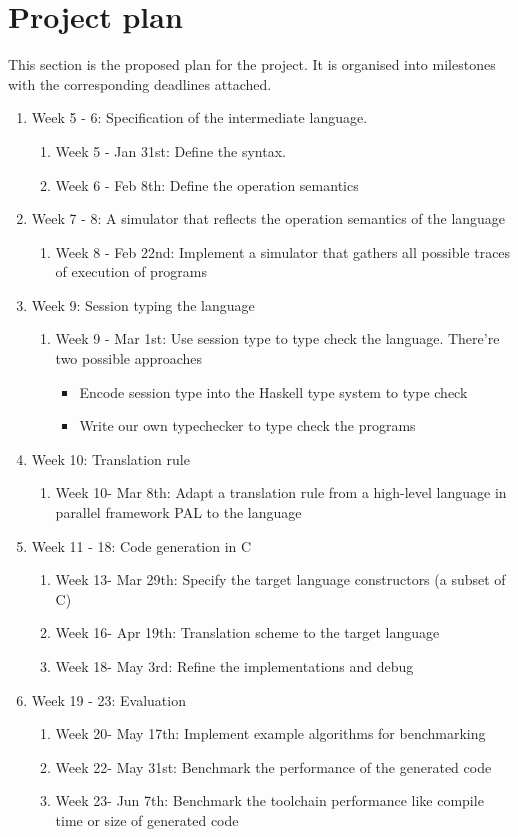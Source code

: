 \chapter{Project plan} \label{plan}
This section is the proposed plan for the project. It is organised into milestones with the corresponding deadlines attached.
\begin{enumerate}
\item Week 5 - 6: Specification of the intermediate language.
\begin{enumerate}
    \item Week 5 - Jan 31st: Define the syntax.  
    \item Week 6 - Feb 8th: Define the operation semantics
\end{enumerate}
\item Week 7 - 8: A simulator that reflects the operation semantics of the language
\begin{enumerate}
    \item Week 8 - Feb 22nd: Implement a simulator that gathers all possible traces of execution of programs
\end{enumerate}
\item Week 9: Session typing the language
\begin{enumerate}
    \item Week 9 - Mar 1st: Use session type to type check the language. There're two possible approaches
    \begin{itemize}
        \item Encode session type into the Haskell type system to type check 
        \item Write our own typechecker to type check the programs
    \end{itemize} 
\end{enumerate}
\item Week 10: Translation rule 
\begin{enumerate}
    \item Week 10- Mar 8th: Adapt a translation rule from a high-level language in parallel framework PAL to the language
\end{enumerate}
\item Week 11 - 18: Code generation in C
\begin{enumerate}
    \item Week 13- Mar 29th: Specify the target language constructors (a subset of C)
    \item Week 16- Apr 19th: Translation scheme to the target language
    \item Week 18- May 3rd: Refine the implementations and debug
\end{enumerate}
\item Week 19 - 23: Evaluation
\begin{enumerate}
    \item Week 20- May 17th: Implement example algorithms for benchmarking
    \item Week 22- May 31st: Benchmark the performance of the generated code
    \item Week 23- Jun 7th: Benchmark the toolchain performance like compile time or size of generated code
\end{enumerate}
\end{enumerate}